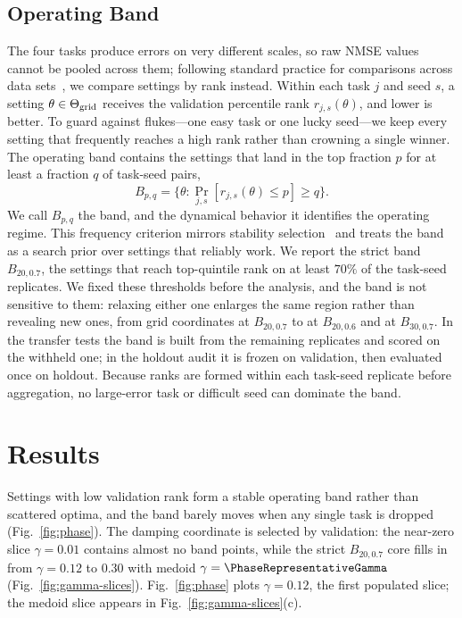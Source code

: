\documentclass[10pt,conference]{IEEEtran}
\begin{document}
\subsection{Operating Band}
The four tasks produce errors on very different scales, so raw NMSE values cannot be pooled across them; following standard practice for comparisons across data sets~\cite{demsar2006}, we compare settings by rank instead. Within each task $j$ and seed $s$, a setting $\theta\in\Theta_{\rm grid}$ receives the validation percentile rank $r_{j,s}(\theta)$, and lower is better. To guard against flukes---one easy task or one lucky seed---we keep every setting that frequently reaches a high rank rather than crowning a single winner. The operating band contains the settings that land in the top fraction $p$ for at least a fraction $q$ of task-seed pairs,
\begin{equation}
B_{p,q}=\{\theta:\Pr_{j,s}[r_{j,s}(\theta)\le p]\ge q\}.
\end{equation}
We call $B_{p,q}$ the band, and the dynamical behavior it identifies the operating regime. This frequency criterion mirrors stability selection~\cite{meinshausen2010} and treats the band as a search prior over settings that reliably work. We report the strict band $B_{20,0.7}$, the settings that reach top-quintile rank on at least $70\%$ of the task-seed replicates. We fixed these thresholds before the analysis, and the band is not sensitive to them: relaxing either one enlarges the same region rather than revealing new ones, from \PhaseBTwentyQSeventySize{} grid coordinates at $B_{20,0.7}$ to \PhaseBTwentyQSixtySize{} at $B_{20,0.6}$ and \PhaseBThirtyQSeventySize{} at $B_{30,0.7}$. In the transfer tests the band is built from the remaining replicates and scored on the withheld one; in the holdout audit it is frozen on validation, then evaluated once on holdout. Because ranks are formed within each task-seed replicate before aggregation, no large-error task or difficult seed can dominate the band.




\section{Results}
Settings with low validation rank form a stable operating band rather than scattered optima, and the band barely moves when any single task is dropped (Fig.~\ref{fig:phase}). The damping coordinate is selected by validation: the near-zero slice $\gamma=0.01$ contains almost no band points, while the strict $B_{20,0.7}$ core fills in from $\gamma=0.12$ to $0.30$ with medoid $\gamma=\PhaseRepresentativeGamma$ (Fig.~\ref{fig:gamma-slices}). Fig.~\ref{fig:phase} plots $\gamma=0.12$, the first populated slice; the medoid slice appears in Fig.~\ref{fig:gamma-slices}(c).
\end{document}
